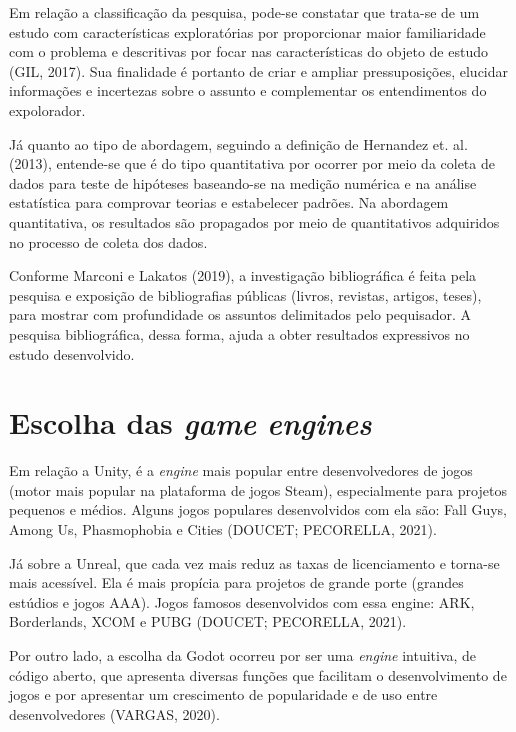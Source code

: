 Em relação a classificação da pesquisa, pode-se constatar que trata-se de um estudo com características exploratórias por proporcionar maior familiaridade com o problema e descritivas por focar nas características do objeto de estudo (GIL, 2017). Sua finalidade é portanto de criar e ampliar pressuposições, elucidar informações e incertezas sobre o assunto e complementar os entendimentos do expolorador.

Já quanto ao tipo de abordagem, seguindo a definição de Hernandez et. al. (2013)\nocite{hernandez2013}, entende-se que é do tipo quantitativa por ocorrer por meio da coleta de dados para teste de hipóteses baseando-se na medição numérica e na análise estatística para comprovar teorias e estabelecer padrões. Na abordagem quantitativa, os resultados são propagados por meio de quantitativos adquiridos no processo de coleta dos dados.

Conforme Marconi e Lakatos (2019)\nocite{marconi2019}, a investigação bibliográfica é feita pela pesquisa e exposição de bibliografias públicas (livros, revistas, artigos, teses), para mostrar com profundidade os assuntos delimitados pelo pequisador. A pesquisa bibliográfica, dessa forma, ajuda a obter resultados expressivos no estudo desenvolvido. 

\section{Escolha das \textit{game} \textit{engines}}
\label{sec:escolha-das-game-engines}

Em relação a Unity, é a \textit{engine} mais popular entre desenvolvedores de jogos (motor mais popular na plataforma de jogos Steam), especialmente para projetos pequenos e médios. Alguns jogos populares desenvolvidos com ela são: Fall Guys, Among Us, Phasmophobia e Cities (DOUCET; PECORELLA, 2021)\nocite{lars2021}.

Já sobre a Unreal, que cada vez mais reduz as taxas de licenciamento e torna-se mais acessível. Ela é mais propícia para projetos de grande porte (grandes estúdios e jogos AAA). Jogos famosos desenvolvidos com essa engine: ARK, Borderlands, XCOM e PUBG (DOUCET; PECORELLA, 2021).

Por outro lado, a escolha da Godot ocorreu por ser uma \textit{engine} intuitiva, de código aberto, que apresenta diversas funções que facilitam o desenvolvimento de jogos e por apresentar um crescimento de popularidade e de uso entre desenvolvedores (VARGAS, 2020)\nocite{vargas2020}. 

